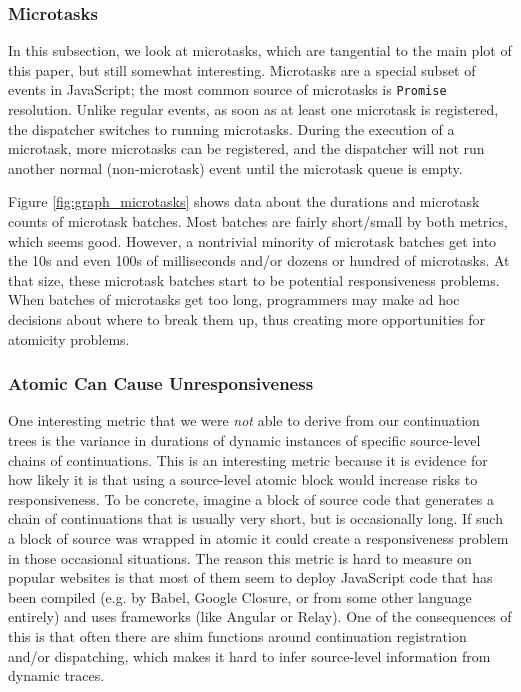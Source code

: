 \documentclass[acmsmall,anonymous,review]{acmart}\settopmatter{printfolios=true,printccs=false,printacmref=false}
\begin{document}
\subsubsection{Microtasks}

In this subsection, we look at microtasks, which are tangential to the main plot of this paper, but still somewhat interesting.
Microtasks are a special subset of events in JavaScript; the most common source of microtasks is \texttt{Promise} resolution.
Unlike regular events, as soon as at least one microtask is registered, the dispatcher switches to running microtasks.
During the execution of a microtask, more microtasks can be registered, and the dispatcher will not run another normal (non-microtask) event until the microtask queue is empty.

Figure \ref{fig:graph_microtasks} shows data about the durations and microtask counts of microtask batches.
Most batches are fairly short/small by both metrics, which seems good.
However, a nontrivial minority of microtask batches get into the 10s and even 100s of milliseconds and/or dozens or hundred of microtasks.
At that size, these microtask batches start to be potential responsiveness problems.
When batches of microtasks get too long, programmers may make ad hoc decisions about where to break them up, thus creating more opportunities for atomicity problems.

\subsubsection{Atomic Can Cause Unresponsiveness}

One interesting metric that we were \emph{not} able to derive from our continuation trees is the variance in durations of dynamic instances of specific source-level chains of continuations.
This is an interesting metric because it is evidence for how likely it is that using a source-level atomic block would increase risks to responsiveness.
To be concrete, imagine a block of source code that generates a chain of continuations that is usually very short, but is occasionally long.
If such a block of source was wrapped in atomic it could create a responsiveness problem in those occasional situations.
The reason this metric is hard to measure on popular websites is that most of them seem to deploy JavaScript code that has been compiled (e.g. by Babel, Google Closure, or from some other language entirely) and uses frameworks (like Angular or Relay).
One of the consequences of this is that often there are shim functions around continuation registration and/or dispatching, which makes it hard to infer source-level information from dynamic traces.
\end{document}
